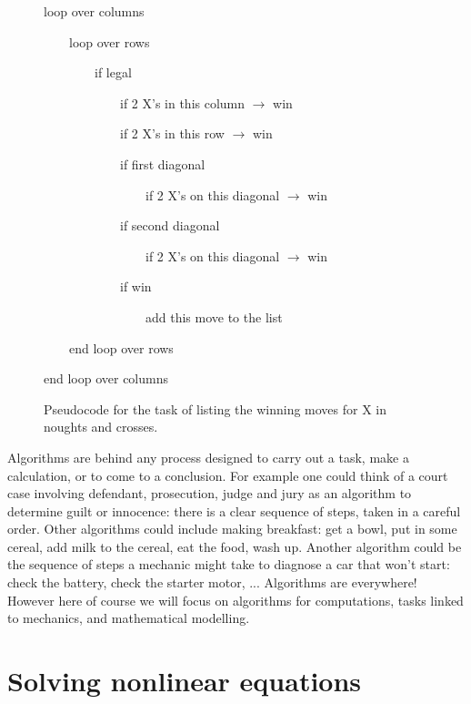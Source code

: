 \begin{figure}
{\tt

loop over columns

\ \ \ \ loop over rows

\ \ \ \ \ \ \ \ if legal

\ \ \ \ \ \ \ \ \ \ \ \ if 2 X's in this column $\rightarrow$ win

\ \ \ \ \ \ \ \ \ \ \ \ if 2 X's in this row $\rightarrow$ win

\ \ \ \ \ \ \ \ \ \ \ \ if first diagonal

\ \ \ \ \ \ \ \ \ \ \ \ \ \ \ \ if 2 X's on this diagonal $\rightarrow$ win

\ \ \ \ \ \ \ \ \ \ \ \ if second diagonal

\ \ \ \ \ \ \ \ \ \ \ \ \ \ \ \ if 2 X's on this diagonal $\rightarrow$ win

\ \ \ \ \ \ \ \ \ \ \ \ if win

\ \ \ \ \ \ \ \ \ \ \ \ \ \ \ \ add this move to the list

\ \ \ \ end loop over rows

end loop over columns

}
\caption{\label{fig:pseudocode2}
Pseudocode for the task of listing the winning moves for X
in noughts and crosses.
}
\end{figure}


Algorithms are behind any process designed to carry out a task, make a calculation, or to come to a conclusion. For example one could think 
of a court case involving defendant, prosecution, judge and jury as an algorithm to determine guilt or innocence: there is a 
clear sequence of steps, taken in a careful order. Other algorithms could include making breakfast: get a bowl, put 
in some cereal, add milk to the cereal, eat the food, wash up. Another algorithm could be the sequence of steps a mechanic might take to 
diagnose a car that won't start: check the battery, check the starter motor, ... Algorithms are everywhere! However here of course we will focus on algorithms for computations, tasks linked to mechanics, and mathematical modelling. 



\section{Solving nonlinear equations}
\label{sec:solve}

